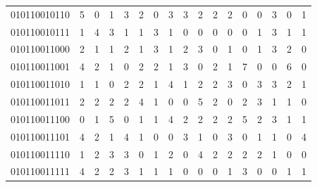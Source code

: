 \documentclass[10pt,a4paper]{article}
\begin{document}
\begin{longtable}{ |c|c|c|c|c|c|c|c|c|c|c|c|c|c|c|c|c| }
    010110010110              & 5                            & 0                                & 1                            & 3                              & 2   & 0   & 3   & 3   & 2   & 2   & 2   & 0   & 0   & 3   & 0   & 1   \\
    010110010111              & 1                            & 4                                & 3                            & 1                              & 1   & 3   & 1   & 0   & 0   & 0   & 0   & 0   & 1   & 3   & 1   & 1   \\
    010110011000              & 2                            & 1                                & 1                            & 2                              & 1   & 3   & 1   & 2   & 3   & 0   & 1   & 0   & 1   & 3   & 2   & 0   \\
    010110011001              & 4                            & 2                                & 1                            & 0                              & 2   & 2   & 1   & 3   & 0   & 2   & 1   & 7   & 0   & 0   & 6   & 0   \\
    010110011010              & 1                            & 1                                & 0                            & 2                              & 2   & 1   & 4   & 1   & 2   & 2   & 3   & 0   & 3   & 3   & 2   & 1   \\
    010110011011              & 2                            & 2                                & 2                            & 2                              & 4   & 1   & 0   & 0   & 5   & 2   & 0   & 2   & 3   & 1   & 1   & 0   \\
    010110011100              & 0                            & 1                                & 5                            & 0                              & 1   & 1   & 4   & 2   & 2   & 2   & 2   & 5   & 2   & 3   & 1   & 1   \\
    010110011101              & 4                            & 2                                & 1                            & 4                              & 1   & 0   & 0   & 3   & 1   & 0   & 3   & 0   & 1   & 1   & 0   & 4   \\
    010110011110              & 1                            & 2                                & 3                            & 3                              & 0   & 1   & 2   & 0   & 4   & 2   & 2   & 2   & 2   & 1   & 0   & 0   \\
    010110011111              & 4                            & 2                                & 2                            & 3                              & 1   & 1   & 1   & 0   & 0   & 0   & 1   & 3   & 0   & 0   & 1   & 1   \\

\end{longtable}
\end{document}
